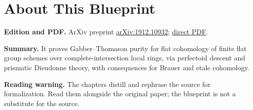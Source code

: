 

\chapter*{About This Blueprint}
\label{purity-flat-cohomology-about}


\textbf{Edition and PDF.} ArXiv preprint \href{https://arxiv.org/abs/1912.10932}{arXiv:1912.10932}; \href{https://arxiv.org/pdf/1912.10932}{direct PDF}.

\textbf{Summary.} It proves Gabber--Thomason purity for flat cohomology of finite flat group schemes over complete-intersection local rings, via perfectoid descent and prismatic Dieudonne theory, with consequences for Brauer and etale cohomology.

\textbf{Reading warning.} The chapters distill and rephrase the source for formalization. Read them alongside the original paper; the blueprint is not a substitute for the source.











